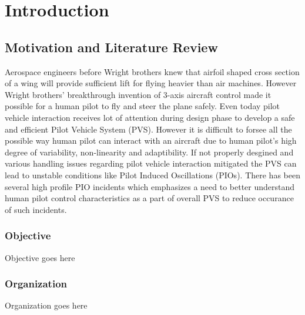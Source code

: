 
\chapter{Introduction} %

\label{Chapter1} %



\section{Motivation and Literature Review}

Aerospace engineers before Wright brothers knew that airfoil shaped cross section of a wing will provide sufficient lift for flying heavier than air machines. However Wright brothers' breakthrough invention of 3-axis aircraft control made it possible for a human pilot to fly and steer the plane safely\cite{birthofflightcontrol}. Even today pilot vehicle interaction receives lot of attention during design phase to develop a safe and efficient Pilot Vehicle System (PVS). However it is difficult to forsee all the possible way human pilot can interact with an aircraft due to human pilot's high degree of variability, non-linearity and adaptibility. If not properly desgined and various handling issues regarding pilot vehicle interaction mitigated the PVS can lead to unstable conditions like Pilot Induced Oscillations (PIOs)\cite{McRuerPIO}. There has been several high profile PIO incidents\cite{SAABPIO}\cite{YF22} which emphasizes a need to better understand human pilot control characteristics as a part of overall PVS to reduce occurance of such incidents.

\subsection{Objective}

Objective goes here


\subsection{Organization}
Organization goes here

